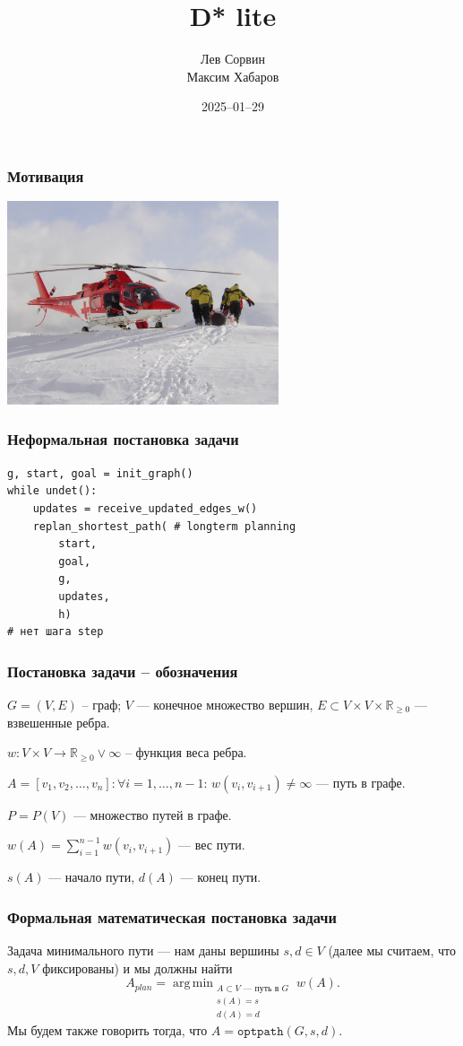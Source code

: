 \documentclass{beamer}
\title{D* lite}
\author{Лев Сорвин \\ Максим Хабаров}
\date{2025--01--29}
\newcommand{\realpositive}{\mathbb{R}_{\geqslant 0}}
\DeclareMathOperator*{\argmin}{arg\,min}
\begin{document}
    \frame{\titlepage}
    \begin{frame}[fragile]
        \frametitle{Мотивация}
        \begin{center}
            \includegraphics[height=6cm]{../figures/medical-evacuation}
        \end{center}
    \end{frame}

    \begin{frame}[fragile]
        \frametitle{Неформальная постановка задачи}
        \begin{verbatim}
g, start, goal = init_graph()
while undet():
    updates = receive_updated_edges_w()
    replan_shortest_path( # longterm planning
        start,
        goal,
        g,
        updates,
        h)
# нет шага step
        \end{verbatim}
    \end{frame}

    \begin{frame}[fragile]
        \frametitle{Постановка задачи -- обозначения}
        $G = (V, E)$ -- граф; $V$ --- конечное множество вершин, $E \subset V \times V \times \realpositive$ --- взвешенные ребра.

        $w: V \times V \rightarrow {\realpositive \lor \infty}$ -- функция веса ребра.

        $A = [v_1, v_2, \dots, v_n]: \forall i = 1, \dots, n-1$: $w(v_i, v_{i+1}) \neq \infty$  --- путь в графе.

        $P = P(V)$ --- множество путей в графе.

        $w(A) = \sum_{i = 1}^{n-1} w(v_i, v_{i+1})$ --- вес пути.

        $s(A)$ --- начало пути, $d(A)$ --- конец пути.

    \end{frame}

    \begin{frame}[fragile]
        \frametitle{Формальная математическая постановка задачи}

        Задача минимального пути --- нам даны вершины $s, d \in V$  (далее мы считаем, что $s, d, V$ фиксированы) и мы должны найти
        $$A_{plan}= \argmin_{\substack{A \subset V \text{ --- путь в } G \\ s(A) = s \\ d(A) = d}} w(A).$$
        Мы будем также говорить тогда, что $A = \mathtt{optpath}(G, s, d)$.

    \end{frame}
\end{document}

